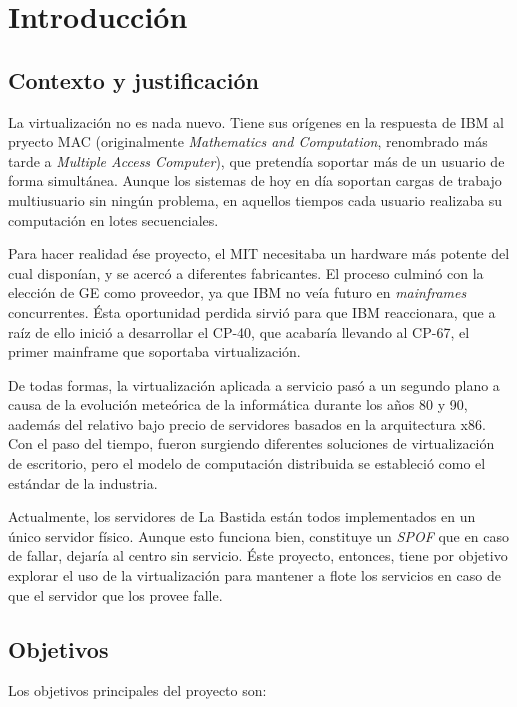 \section{Introducción}
\label{sec:aim}

\subsection{Contexto y justificación}
\label{subsec:context}

La virtualización no es nada nuevo. Tiene sus orígenes en la respuesta de IBM al pryecto MAC (originalmente \emph{Mathematics and Computation}, renombrado más tarde a \emph{Multiple Access Computer}), que pretendía soportar más de un usuario de forma simultánea. Aunque los sistemas de hoy en día soportan cargas de trabajo multiusuario sin ningún problema, en aquellos tiempos cada usuario realizaba su computación en lotes secuenciales.

Para hacer realidad ése proyecto, el MIT necesitaba un hardware más potente del cual disponían, y se acercó a diferentes fabricantes. El proceso culminó con la elección  de GE como proveedor, ya que IBM no veía futuro en \emph{mainframes} concurrentes. Ésta oportunidad perdida sirvió para que IBM reaccionara, que a raíz de ello inició a desarrollar el CP-40, que acabaría llevando al CP-67, el primer mainframe que soportaba virtualización.

De todas formas, la virtualización aplicada a servicio pasó a un segundo plano a causa de la evolución meteórica de la informática durante los años 80 y 90, aademás del relativo bajo precio de servidores basados en la arquitectura x86. Con el paso del tiempo, fueron surgiendo diferentes soluciones de virtualización de escritorio, pero el modelo de computación distribuida se estableció como el estándar de la industria.

Actualmente, los servidores de La Bastida están todos implementados en un único servidor físico. Aunque esto funciona bien, constituye un \emph{SPOF} que en caso de fallar, dejaría al centro sin servicio. Éste proyecto, entonces, tiene por objetivo explorar el uso de la virtualización para mantener a flote los servicios en caso de que el servidor que los provee falle.

\subsection{Objetivos}
\label{subsec:objectives}

Los objetivos principales del proyecto son:

